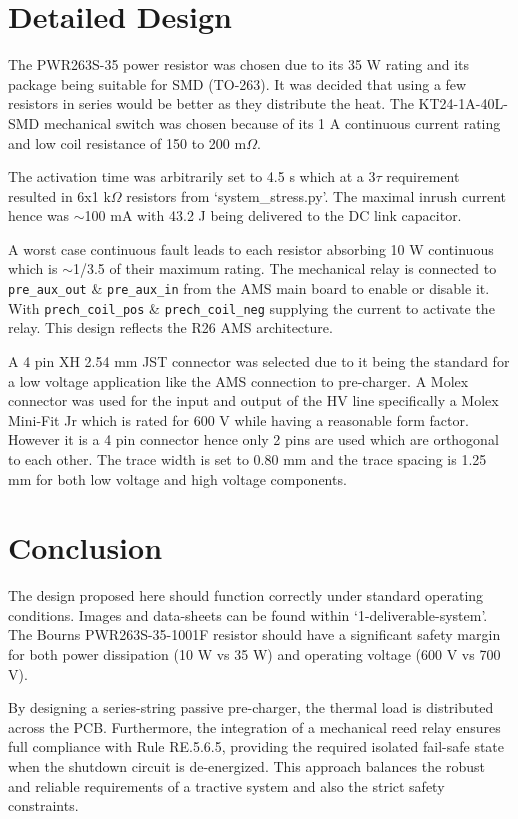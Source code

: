 \documentclass{article}
\begin{document}
\section{Detailed Design}
The PWR263S-35 power resistor was chosen due to its 35 W rating and its package being suitable for SMD (TO-263). It was decided that
using a few resistors in series would be better as they distribute the heat. The KT24-1A-40L-SMD mechanical switch was
chosen because of its 1 A continuous current rating and low coil resistance of 150 to 200 m$\Omega$.

\vspace{0.5cm}
The activation time was arbitrarily set to 4.5 s which at a 3$\tau$ requirement resulted in 6x1 k$\Omega$ resistors from `system\_stress.py'.
The maximal inrush current hence was $\sim$100 mA with 43.2 J being delivered to the DC link capacitor.

\vspace{0.5cm}
A worst case continuous fault leads to each resistor absorbing 10 W continuous which is $\sim$1/3.5 of their maximum rating.
The mechanical relay is 
connected to \texttt{pre\_aux\_out} \& \texttt{pre\_aux\_in} from the AMS main board to enable or disable it. With \texttt{prech\_coil\_pos} \&
\texttt{prech\_coil\_neg} supplying the current to activate the relay. This design reflects the R26 AMS architecture. 

\vspace{0.5cm}
A 4 pin XH 2.54 mm JST connector was selected due to it being the standard for a low voltage application like the AMS connection to pre-charger. A Molex
connector was used for the input and output of the HV line specifically a Molex Mini-Fit Jr which is rated for 600 V while having a reasonable form factor.
However it is a 4 pin connector hence only 2 pins are used which are orthogonal to each other. The trace width is set to 0.80 mm and the trace spacing is
1.25 mm for both low voltage and high voltage components.


\section{Conclusion}
The design proposed here should function correctly under standard operating conditions. Images and data-sheets can be found within `1-deliverable-system'.
The Bourns PWR263S-35-1001F resistor should have a significant safety margin for both power dissipation (10 W vs 35 W) and operating voltage (600 V vs 700 V).

By designing a series-string passive pre-charger, the thermal load is distributed across the PCB. Furthermore, the integration of a mechanical reed relay 
ensures full compliance with Rule RE.5.6.5, providing the required isolated fail-safe state when the shutdown circuit is de-energized. This approach
balances the robust and reliable requirements of a tractive system and also the strict safety constraints.
\end{document}
